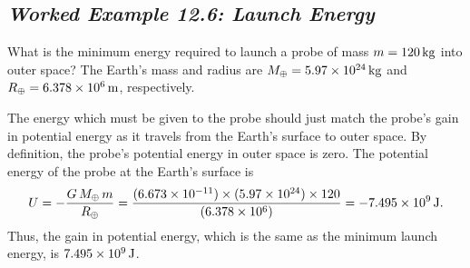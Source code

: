 \subsection*{\em Worked Example 12.6: Launch Energy}
 What is the minimum energy required to launch a probe
of mass $m=120\,{\rm kg}$ into outer space? The Earth's mass and radius are
$M_\oplus =5.97\times 10^{24}\,{\rm kg}$ and $R_\oplus = 6.378\times 10^6\,{\rm m}$, 
respectively.

 The energy which must be given to the probe should
just match the probe's gain in potential energy as it travels  from the Earth's
surface to outer space. By definition, the probe's potential energy in outer
space is zero. The potential energy of the probe at the Earth's surface
is
$$
U = - \frac{G\,M_\oplus\,m}{R_\oplus} = \frac{(6.673\times 10^{-11})\times (5.97\times 10^{24})\times 120}
{( 6.378\times 10^6)} = -7.495\times 10^9\,{\rm J}.
$$
Thus, the gain in potential energy, which is the same as the minimum launch energy, is
$7.495\times 10^9\,{\rm J}$.
